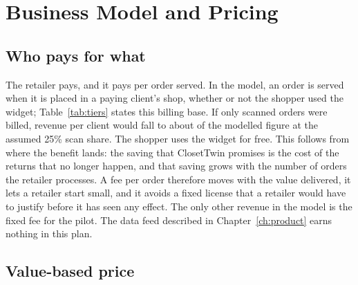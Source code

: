 \chapter{Business Model and Pricing}\label{ch:business}

\section{Who pays for what}\label{sec:pay}

The retailer pays, and it pays per order served. In the model, an order is served when it is placed in a paying client's shop, whether or not the shopper used the widget; Table~\ref{tab:tiers} states this billing base. If only scanned orders were billed, revenue per client would fall to about  of the modelled figure at the assumed 25\% scan share. The shopper uses the widget for free. This follows from where the benefit lands: the saving that ClosetTwin promises is the cost of the returns that no longer happen, and that saving grows with the number of orders the retailer processes. A fee per order therefore moves with the value delivered, it lets a retailer start small, and it avoids a fixed license that a retailer would have to justify before it has seen any effect. The only other revenue in the model is the fixed fee for the pilot. The data feed described in Chapter~\ref{ch:product} earns nothing in this plan.

\section{Value-based price}\label{sec:pricing-value}

